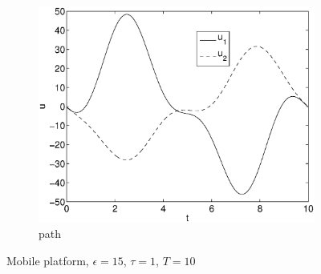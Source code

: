 \begin{figure}[h]
\begin{subfigure}[b]{\textwidth}
\centering
\includegraphics[height=0.3\textheight]{img/final_1_15_10_u.eps}
\caption{path}
\end{subfigure}
\caption{Mobile platform, $\epsilon=15$, $\tau=1$, $T=10$}
\label{fig:pl5}
\end{figure}

